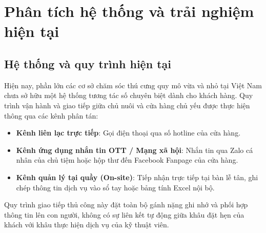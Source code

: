 \section{Phân tích hệ thống và trải nghiệm hiện tại}

\subsection{Hệ thống và quy trình hiện tại}
Hiện nay, phần lớn các cơ sở chăm sóc thú cưng quy mô vừa và nhỏ tại Việt Nam chưa sở hữu một hệ thống tương tác số chuyên biệt dành cho khách hàng. Quy trình vận hành và giao tiếp giữa chủ nuôi và cửa hàng chủ yếu được thực hiện thông qua các kênh phân tán:
\begin{itemize}
    \item \textbf{Kênh liên lạc trực tiếp}: Gọi điện thoại qua số hotline của cửa hàng.
    \item \textbf{Kênh ứng dụng nhắn tin OTT / Mạng xã hội}: Nhắn tin qua Zalo cá nhân của chủ tiệm hoặc hộp thư đến Facebook Fanpage của cửa hàng.
    \item \textbf{Kênh quản lý tại quầy (On-site)}: Tiếp nhận trực tiếp tại bàn lễ tân, ghi chép thông tin dịch vụ vào sổ tay hoặc bảng tính Excel nội bộ.
\end{itemize}

Quy trình giao tiếp thủ công này đặt toàn bộ gánh nặng ghi nhớ và phối hợp thông tin lên con người, không có sự liên kết tự động giữa khâu đặt hẹn của khách với khâu thực hiện dịch vụ của kỹ thuật viên.

